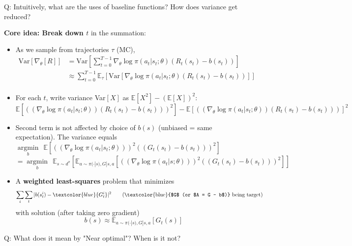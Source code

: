 \documentclass{article}
\begin{document}
\begin{hintbox}
    Q: Intuitively, what are the uses of baseline functions? How does variance get reduced?
    \begin{prfbox}
        \textbf{Core idea: Break down $t$} in the summation:
        \begin{itemize}
        \item As we sample from trajectories $\tau$ (MC),
            $\begin{aligned}
                \text{Var}[ \nabla_{\theta} [R]] & 
                = \text{Var}[ \sum_{t = 0}^{T-1} \nabla_{\theta} \log \pi(a_t | s_t; \theta) (R_t (s_t) - b(s_t))]\\ & 
                \approx \sum_{t = 0}^{T-1} \mathbb{E}_{\tau} \left[ \text{Var}[\nabla_{\theta} \log \pi(a_t|s_t ; \theta) (R_t(s_t) - b(s_t))] \right]\\
            \end{aligned}$
        \item For each $t$, write variance Var$[X]$ as $\mathbb{E}[X^2] - (\mathbb{E}[X])^2$:
            \\$\mathbb{E}\left[\left((\nabla_{\theta} \log \pi(a_t | s_t ; \theta)) (R_t(s_t) - b(s_t)) \right)^2 \right]
            - \mathbb{E}\left[\left((\nabla_{\theta} \log \pi(a_t | s_t ; \theta)) (R_t(s_t) - b(s_t)) \right) \right]^2$
        \item Second term is not affected by choice of $b(s)$ (unbiased = same expectation). The variance equals
            $\mathop{\arg\min}\limits_{b} ~~\mathbb{E}\left[\left((\nabla_{\theta} \log \pi(a_t | s_t ; \theta))\right)^2 \left((G_t(s_t) - b(s_t)) \right)^2 \right]$
            \\$=\mathop{\arg\min}\limits_{b} ~~\mathbb{E}_{s \sim d^{\pi}}\left[ \mathbb{E}_{a \sim \pi(\cdot | s), G | s, a} \left[ \left((\nabla_{\theta} \log \pi(a_t | s ; \theta))\right)^2 \left((G_t(s_t) - b(s_t)) \right)^2 \right] \right]$
        \item A \textbf{weighted least-squares} problem that minimizes
            \begin{equation*}
                \sum_{i} \sum_{t} |b(s^{i}_{t}) - \textcolor{blue}{G^{i}_{t}}|^2 \quad\quad \text{(\textcolor{blue}{$G$ (or $A = G - b$)} being target)}
            \end{equation*}            
            with solution (after taking zero gradient)
            \begin{equation*}
                b(s) \approx \mathbb{E}_{a \sim \pi(\cdot | s), G | s, a} [G_t (s)]
            \end{equation*}
        \end{itemize}
    \end{prfbox}

    Q: What does it mean by "Near optimal"? When is it not?
\end{hintbox}
\end{document}
